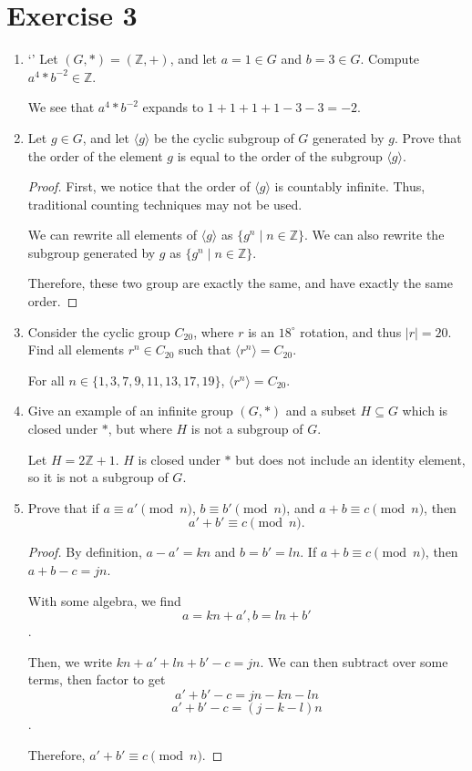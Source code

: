 \documentclass{article}
\begin{document}
\section*{Exercise 3}
\begin{enumerate}
    \item {`'
        Let \((G, *) = (\mathbb{Z}, +)\), and let \(a = 1 \in G\) and \(b = 3 \in G\). Compute \(a^4 * b^{-2} \in \mathbb{Z}\).
      
        We see that \(a^4 * b^{-2}\) expands to \(1+1+1+1-3-3 = -2\).
    }
    \item {
        Let \(g \in G\), and let \(\langle g \rangle\) be the cyclic subgroup of \(G\) generated by \(g\). Prove that the order of the element \(g\) is equal to the order of the subgroup \(\langle g \rangle\).
    
        \begin{proof}
            First, we notice that the order of \(\langle g \rangle\) is countably
            infinite. Thus, traditional counting techniques may not be used.

            We can rewrite all elements of \(\langle g \rangle\) as \(\{g^n \mid n \in \mathbb{Z}\}\).
            We can also rewrite the subgroup generated by \(g\) as \(\{g^n \mid n \in \mathbb{Z}\}\).

            Therefore, these two group are exactly the same, and have exactly the same order.
        \end{proof}
    }
    \item {
        Consider the cyclic group \(C_{20}\), where \(r\) is an \(18^\circ\) rotation, and thus \(|r| = 20\). Find all elements \(r^n \in C_{20}\) such that \(\langle r^n \rangle = C_{20}\).
    
        For all \(n \in \{1, 3, 7, 9, 11, 13, 17, 19\}\), \(\langle r^n \rangle = C_{20}\).
    }
    \item {
        Give an example of an infinite group \((G,*)\) and a subset \(H \subseteq G\) which is closed under \(*\), but where \(H\) is not a subgroup of \(G\).

        Let \(H = 2\mathbb{Z} + 1\). \(H\) is closed under \(*\) but does not include 
        an identity element, so it is not a subgroup of \(G\).
    }
    \item {
        Prove that if \(a \equiv a' \pmod n\), \(b \equiv b' \pmod n\), and \(a + b \equiv c \pmod n\), then \[         a' + b' \equiv c \pmod n.       \]

        \begin{proof}
            By definition, \(a - a' = kn\) and \(b = b' = ln\). If \(a + b \equiv c \pmod n\),
            then \(a + b - c = jn\). 

            With some algebra, we find 
            \[a = kn + a', b = ln + b'\].

            Then, we write \(kn + a' + ln + b' - c = jn\). We can then subtract over 
            some terms, then factor to get
            \[a' + b' - c = jn - kn -ln\]
            \[a' + b' - c = (j - k - l)n\].
            
            Therefore, \(a' + b' \equiv c \pmod n\). 
        \end{proof}
    }
\end{enumerate}
\end{document}
